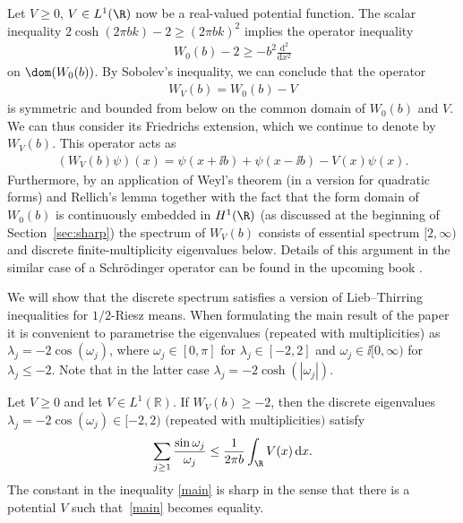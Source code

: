 Let $V\ge0$, $V\in L^1(\R)$ now be a real-valued potential function. The scalar inequality $2\cosh(2\pi b k)-2\ge (2\pi b k)^2$ implies the operator inequality
\begin{gather}
W_0(b)-2\ge-b^2\frac{\mathrm{d}^2}{\mathrm{d}x^2}
\label{WH}
\end{gather}
on $\dom(W_0(b))$. By Sobolev's inequality, we can conclude that the operator
\begin{gather*}%
W_V(b)=W_0(b)- V
\end{gather*}
is symmetric and bounded from below on the common domain of $W_0(b)$ and $V$.
We can thus consider its Friedrichs extension, which we continue to denote by $W_V(b)$. This operator acts as
\begin{gather*}
(W_V(b)\psi)(x)=\psi(x+\ii b)+\psi(x-\ii b)-V(x)\psi(x).
\end{gather*}
Furthermore, by an application of Weyl's theorem (in a version for quadratic forms) and Rellich's lemma together with the fact that the form domain of $W_0(b)$ is continuously embedded in $H^1(\R)$ (as discussed at the beginning of Section~\ref{sec:sharp}) the spectrum of $W_V(b)$ consists of essential spectrum $[2,\infty)$ and discrete finite-multiplicity eigenvalues below. Details of this argument in the similar case of a Schr\"odinger operator can be found in the upcoming book \cite[Proposition 4.14]{FLW}.

We will show that the discrete spectrum satisfies a version of Lieb--Thirring inequalities for $1/2$-Riesz means.
When formulating the main result of the paper it is convenient to parametrise the eigenvalues (repeated with multiplicities) as $\lambda_j = - 2\cos(\omega_j)$, where $\omega_j\in [0,\pi]$ for
$\lambda_j\in[-2,2]$ and $\omega_j\in \ii [0,\infty)$ for $\lambda_j\le -2$.
Note that in the latter case $\lambda_j = - 2\cosh(|\omega_j|)$.

\begin{Theorem}\label{1}
Let $V\ge 0$ and let $V\in L^1(\mathbb R)$. If $W_V(b)\ge-2$, then
the discrete eigenvalues $\lambda_j=-2\cos(\omega_j)\in [-2,2)$ $($repeated with multiplicities$)$ satisfy
\begin{gather}\label{main}
\sum_{j\ge1}\frac{\sin\omega_j}{\omega_j}\le \frac{1}{2\pi b}\int_{\R}V(x) \, {\rm d} x.
\end{gather}
The constant in the inequality \eqref{main} is sharp in the sense that there is a potential
$V$ such that~\eqref{main} becomes equality.
\end{Theorem}

